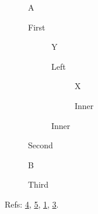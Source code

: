 \documentclass{article}
\begin{document}
\begin{figure}A\caption{First}\end{figure}
\begin{figure}
  \begin{subfigure}{0.45\textwidth}Y\caption{Left}\label{sub:left}\end{subfigure}
  \begin{subfigure}{0.45\textwidth}
    \begin{subfigure}{0.5\textwidth}X\caption{Inner}\label{sub:in}\end{subfigure}
  \end{subfigure}
  \caption{Second}\label{fig:two}
\end{figure}
\begin{figure}B\caption{Third}\label{fig:three}\end{figure}
Refs: \ref{fig:two}, \ref{fig:three}, \ref{sub:left}, \ref{sub:in}.
\end{document}
